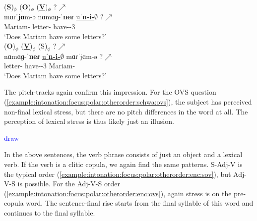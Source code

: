 \begin{exe}
	\ex \begin{xlist}
		\ex \glll (\textbf{S})$_\phi$ (\textbf{O})$_\phi$ (\textbf{\underline{V}})$_\phi$ ?$\nearrow$ \\
		mɑɾˈ\textbf{jɑ}m-ə nɑmɑɡ-ˈ\textbf{neɾ} \underline{uˈ\textbf{n-i-$\emptyset$}} ?$\nearrow$ \\
		Mariam-{} letter-{\pl} have-{\thgloss}-3{\sg} \\
		\trans `Does Mariam have some letters?' 
		\label{example:intonation:focus:polar:otherorder:schwa:sov}
		\\ 
		\ex \glll (\textbf{O})$_\phi$ (\textbf{\underline{V}})$_\phi$  ({S})$_\phi$ ?$\nearrow$ \\
		nɑmɑɡ-ˈ\textbf{neɾ} \underline{uˈ\textbf{n-i-$\emptyset$}} mɑɾˈ{jɑ}m-ə   ?$\nearrow$ \\
		letter-{\pl} have-{\thgloss}-3{\sg} Mariam-{}  \\
		\trans `Does Mariam have some letters?' 
		\label{example:intonation:focus:polar:otherorder:schwa:ovs}
		\\ 
		
	\end{xlist}
\end{exe}

The pitch-tracks again confirm this impression. For the OVS question (\ref{example:intonation:focus:polar:otherorder:schwa:ovs}), the subject has perceived non-final lexical stress, but there are no pitch  differences in the word at all. The perception of lexical stress is thus likely just an illusion. 

\textcolor{blue}{draw}

In the above sentences, the verb phrase consists of just an object and a lexical verb. If the verb is a   clitic copula, we again find the same patterns. S-Adj-V is the typical order (\ref{example:intonation:focus:polar:otherorder:enc:sov}), but Adj-V-S is possible.  For the Adj-V-S order (\ref{example:intonation:focus:polar:otherorder:enc:ovs}), again stress is   on the pre-copula  word. The sentence-final rise starts from the final syllable of this word and continues to the final syllable. 

